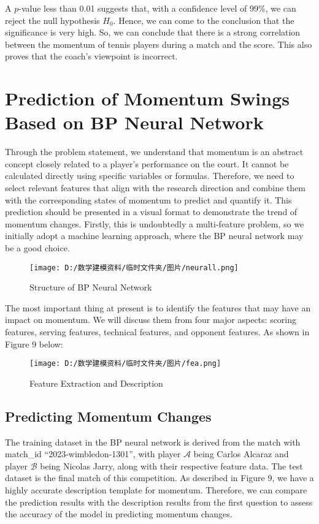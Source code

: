 \documentclass{mcmthesis}
\begin{document}
A $p$-value less than 0.01 suggests that, with a confidence level of 99\%, we can reject the null hypothesis $H_0$. Hence, we can come to the conclusion that the significance is very high. So, we can conclude that there is a strong correlation between the momentum of tennis players during a match and the score. This also proves that the coach's viewpoint is incorrect.
\section{Prediction of Momentum Swings Based on BP Neural Network} 
Through the problem statement, we understand that momentum is an abstract concept closely related to a player's performance on the court. It cannot be calculated directly using specific variables or formulas. Therefore, we need to select relevant features that align with the research direction and combine them with the corresponding states of momentum to predict and quantify it. This prediction should be presented in a visual format to demonstrate the trend of momentum changes. Firstly, this is undoubtedly a multi-feature problem, so we initially adopt a machine learning approach, where the BP neural network may be a good choice.
\begin{figure}[H]
	\small
	\centering
	\texttt{[image: D:/数学建模资料/临时文件夹/图片/neurall.png]}
	\caption{Structure of BP Neural Network} \label{fig:aa}
\end{figure}

The most important thing at present is to identify the features that may have an impact on momentum. We will discuss them from four major aspects: scoring features, serving features, technical features, and opponent features. As shown in Figure 9 below:
\begin{figure}[H]
	\small
	\centering
	\texttt{[image: D:/数学建模资料/临时文件夹/图片/fea.png]}
	\caption{Feature Extraction and Description} \label{fig:aa}
\end{figure}
\subsection{Predicting Momentum Changes}
The training dataset in the BP neural network is derived  from the match with match\_id ``2023-wimbledon-1301'', with player $\mathcal{A}$ being Carlos Alcaraz and player $\mathcal{B}$ being Nicolas Jarry, along with their respective feature data. The test dataset is the final match of this competition. As described in Figure 9, we have a highly accurate description template for momentum. Therefore, we can compare the prediction results with the description results from the first question to assess the accuracy of the model in predicting momentum changes.
\end{document}
